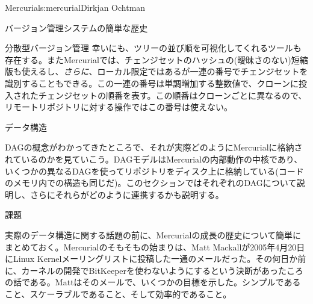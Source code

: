 \begin{aosachapter}{Mercurial}{s:mercurial}{Dirkjan Ochtman}
\begin{aosasect1}{バージョン管理システムの簡単な歴史}
\begin{aosasect2}{分散型バージョン管理}
幸いにも、ツリーの並び順を可視化してくれるツールも存在する。またMercurialでは、チェンジセットのハッシュの(曖昧さのない)短縮版も使えるし、\emph{さらに}、ローカル限定ではあるが一連の番号でチェンジセットを識別することもできる。この一連の番号は単調増加する整数値で、クローンに投入されたチェンジセットの順番を表す。この順番はクローンごとに異なるので、リモートリポジトリに対する操作ではこの番号は使えない。

\end{aosasect2}

\end{aosasect1}

\begin{aosasect1}{データ構造}

DAGの概念がわかってきたところで、それが実際どのようにMercurialに格納されているのかを見ていこう。DAGモデルはMercurialの内部動作の中核であり、いくつかの異なるDAGを使ってリポジトリをディスク上に格納している(コードのメモリ内での構造も同じだ)。このセクションではそれぞれのDAGについて説明し、さらにそれらがどのように連携するかも説明する。

\begin{aosasect2}{課題}

実際のデータ構造に関する話題の前に、Mercurialの成長の歴史について簡単にまとめておく。Mercurialのそもそもの始まりは、Matt Mackallが2005年4月20日にLinux Kernelメーリングリストに投稿した一通のメールだった。その何日か前に、カーネルの開発でBitKeeperを使わないようにするという決断があったころの話である。Mattはそのメールで、いくつかの目標を示した。シンプルであること、スケーラブルであること、そして効率的であること。


\end{aosasect2}
\end{aosasect1}
\end{aosachapter}
